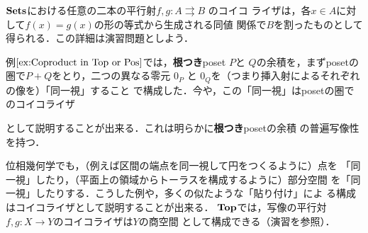 \begin{example}
 $\mathbf{Sets}$における任意の二本の平行射$f, g: A \rightrightarrows B$ のコイコ
 ライザは，各$x \in A$に対して$f(x) = g(x)$の形の等式から生成される同値
 関係で$B$を割ったものとして得られる．この詳細は演習問題としよう．
\end{example}

\begin{example}
 例$\ref{ex:Coproduct in Top or Pos}$では，{\bfseries 根つき}poset $P$と
 $Q$の余積を，まずposetの圏で$P+Q$をとり，二つの異なる零元
 $0_P$ と $0_Q$を（つまり挿入射によるそれぞれの像を）「同一視」すること
 で構成した．今や，この「同一視」はposetの圏でのコイコライザ
 \begin{center}
 \end{center}
 として説明することが出来る．これは明らかに{\bfseries 根つき}posetの余積
 の普遍写像性を持つ．

 位相幾何学でも，（例えば区間の端点を同一視して円をつくるように）点を
 「同一視」したり，（平面上の領域からトーラスを構成するように）部分空間
 を「同一視」したりする．こうした例や，多くの似たような「貼り付け」によ
 る構成はコイコライザとして説明することが出来る．
 ${\bf Top}$では，写像の平行対$f, g: X \to Y$のコイコライザは$Y$の商空間
 として構成できる（演習を参照）．
\end{example}

